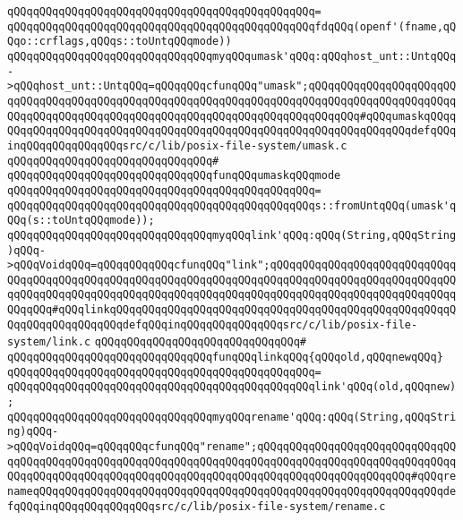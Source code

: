 \verb|qQQqqQQqqQQqqQQqqQQqqQQqqQQqqQQqqQQqqQQqqQQqqQQq=|\newline
\verb|qQQqqQQqqQQqqQQqqQQqqQQqqQQqqQQqqQQqqQQqqQQqqQQqfdqQQq(openf'(fname,qQQqo::crflags,qQQqs::toUntqQQqmode))|\newline
\newline
\verb|qQQqqQQqqQQqqQQqqQQqqQQqqQQqqQQqmyqQQqumask'qQQq:qQQqhost_unt::UntqQQq->qQQqhost_unt::UntqQQq=qQQqqQQqcfunqQQq"umask";qQQqqQQqqQQqqQQqqQQqqQQqqQQqqQQqqQQqqQQqqQQqqQQqqQQqqQQqqQQqqQQqqQQqqQQqqQQqqQQqqQQqqQQqqQQqqQQqqQQqqQQqqQQqqQQqqQQqqQQqqQQqqQQqqQQqqQQqqQQqqQQqqQQq#qQQqumaskqQQqqQQqqQQqqQQqqQQqqQQqqQQqqQQqqQQqqQQqqQQqqQQqqQQqqQQqqQQqqQQqqQQqdefqQQqinqQQqqQQqqQQqqQQqsrc/c/lib/posix-file-system/umask.c|\newline
\verb|qQQqqQQqqQQqqQQqqQQqqQQqqQQqqQQq#|\newline
\verb|qQQqqQQqqQQqqQQqqQQqqQQqqQQqqQQqfunqQQqumaskqQQqmode|\newline
\verb|qQQqqQQqqQQqqQQqqQQqqQQqqQQqqQQqqQQqqQQqqQQqqQQq=|\newline
\verb|qQQqqQQqqQQqqQQqqQQqqQQqqQQqqQQqqQQqqQQqqQQqqQQqs::fromUntqQQq(umask'qQQq(s::toUntqQQqmode));|\newline
\newline
\newline
\verb|qQQqqQQqqQQqqQQqqQQqqQQqqQQqqQQqmyqQQqlink'qQQq:qQQq(String,qQQqString)qQQq->qQQqVoidqQQq=qQQqqQQqqQQqcfunqQQq"link";qQQqqQQqqQQqqQQqqQQqqQQqqQQqqQQqqQQqqQQqqQQqqQQqqQQqqQQqqQQqqQQqqQQqqQQqqQQqqQQqqQQqqQQqqQQqqQQqqQQqqQQqqQQqqQQqqQQqqQQqqQQqqQQqqQQqqQQqqQQqqQQqqQQqqQQqqQQqqQQqqQQqqQQqqQQqqQQq#qQQqlinkqQQqqQQqqQQqqQQqqQQqqQQqqQQqqQQqqQQqqQQqqQQqqQQqqQQqqQQqqQQqqQQqqQQqqQQqdefqQQqinqQQqqQQqqQQqqQQqsrc/c/lib/posix-file-system/link.c|\newline
\verb|qQQqqQQqqQQqqQQqqQQqqQQqqQQqqQQq#|\newline
\verb|qQQqqQQqqQQqqQQqqQQqqQQqqQQqqQQqfunqQQqlinkqQQq{qQQqold,qQQqnewqQQq}|\newline
\verb|qQQqqQQqqQQqqQQqqQQqqQQqqQQqqQQqqQQqqQQqqQQqqQQq=|\newline
\verb|qQQqqQQqqQQqqQQqqQQqqQQqqQQqqQQqqQQqqQQqqQQqqQQqlink'qQQq(old,qQQqnew);|\newline
\newline
\newline
\verb|qQQqqQQqqQQqqQQqqQQqqQQqqQQqqQQqmyqQQqrename'qQQq:qQQq(String,qQQqString)qQQq->qQQqVoidqQQq=qQQqqQQqcfunqQQq"rename";qQQqqQQqqQQqqQQqqQQqqQQqqQQqqQQqqQQqqQQqqQQqqQQqqQQqqQQqqQQqqQQqqQQqqQQqqQQqqQQqqQQqqQQqqQQqqQQqqQQqqQQqqQQqqQQqqQQqqQQqqQQqqQQqqQQqqQQqqQQqqQQqqQQqqQQqqQQqqQQqqQQq#qQQqrenameqQQqqQQqqQQqqQQqqQQqqQQqqQQqqQQqqQQqqQQqqQQqqQQqqQQqqQQqqQQqqQQqdefqQQqinqQQqqQQqqQQqqQQqsrc/c/lib/posix-file-system/rename.c|\newline
